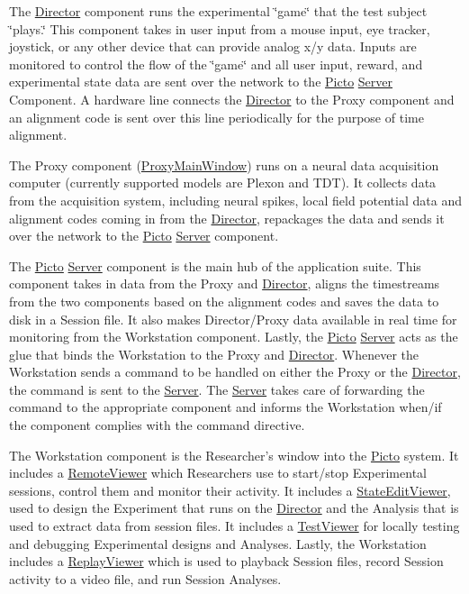 \begin{DoxyItemize}
\item The \hyperlink{class_director}{Director} component runs the experimental \char`\"{}game\char`\"{} that the test subject \char`\"{}plays.\char`\"{} This component takes in user input from a mouse input, eye tracker, joystick, or any other device that can provide analog x/y data. Inputs are monitored to control the flow of the \char`\"{}game\char`\"{} and all user input, reward, and experimental state data are sent over the network to the \hyperlink{namespace_picto}{Picto} \hyperlink{class_server}{Server} Component. A hardware line connects the \hyperlink{class_director}{Director} to the Proxy component and an alignment code is sent over this line periodically for the purpose of time alignment.
\item The Proxy component (\hyperlink{class_proxy_main_window}{Proxy\-Main\-Window}) runs on a neural data acquisition computer (currently supported models are Plexon and T\-D\-T). It collects data from the acquisition system, including neural spikes, local field potential data and alignment codes coming in from the \hyperlink{class_director}{Director}, repackages the data and sends it over the network to the \hyperlink{namespace_picto}{Picto} \hyperlink{class_server}{Server} component.
\item The \hyperlink{namespace_picto}{Picto} \hyperlink{class_server}{Server} component is the main hub of the application suite. This component takes in data from the Proxy and \hyperlink{class_director}{Director}, aligns the timestreams from the two components based on the alignment codes and saves the data to disk in a Session file. It also makes Director/\-Proxy data available in real time for monitoring from the Workstation component. Lastly, the \hyperlink{namespace_picto}{Picto} \hyperlink{class_server}{Server} acts as the glue that binds the Workstation to the Proxy and \hyperlink{class_director}{Director}. Whenever the Workstation sends a command to be handled on either the Proxy or the \hyperlink{class_director}{Director}, the command is sent to the \hyperlink{class_server}{Server}. The \hyperlink{class_server}{Server} takes care of forwarding the command to the appropriate component and informs the Workstation when/if the component complies with the command directive.
\item The Workstation component is the Researcher's window into the \hyperlink{namespace_picto}{Picto} system. It includes a \hyperlink{class_remote_viewer}{Remote\-Viewer} which Researchers use to start/stop Experimental sessions, control them and monitor their activity. It includes a \hyperlink{class_state_edit_viewer}{State\-Edit\-Viewer}, used to design the Experiment that runs on the \hyperlink{class_director}{Director} and the Analysis that is used to extract data from session files. It includes a \hyperlink{class_test_viewer}{Test\-Viewer} for locally testing and debugging Experimental designs and Analyses. Lastly, the Workstation includes a \hyperlink{class_replay_viewer}{Replay\-Viewer} which is used to playback Session files, record Session activity to a video file, and run Session Analyses.
\end{DoxyItemize}

